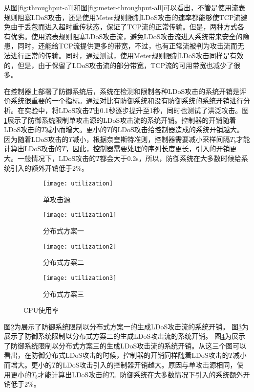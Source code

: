 从图\ref{fig:throughput-all}和图\ref{fig:meter-throughput-all}可以看出，不管是使用流表规则阻塞LDoS攻击，还是使用Meter规则限制LDoS攻击的速率都能够使TCP流避免由于丢包而进入超时重传状态，保证了TCP流的正常传输。但是，两种方式各有优劣。使用流表规则阻塞LDoS攻击流，避免LDoS攻击流进入系统带来安全的隐患，同时，还能给TCP流提供更多的带宽，不过，也有正常流被判为攻击流而无法进行正常的传输。同时，通过测试，使用Meter规则限制LDoS攻击同样是有效的，但是，由于保留了LDoS攻击流的部分带宽，TCP流的可用带宽也减少了很多。

在控制器上部署了防御系统后，系统在检测和限制各种LDoS攻击的系统开销是评价系统很重要的一个指标。通过对比有防御系统和没有防御系统的系统开销进行分析。在实验中，将LDoS攻击$T$由0.1秒逐步提升至1秒，同时也测试了洪泛攻击。图\ref{fig:CPU-single}展示了防御系统限制单攻击源的LDoS攻击流的系统开销。控制器的开销随着LDoS攻击的$T$减小而增大。更小的$T$的LDoS攻击给控制器造成的系统开销越大。因为随着LDoS攻击的$T$减小，根据奈奎斯特准则，控制器需要减小采样间隔$T_b$才能计算出LDoS攻击的$T$，因此，控制器需要处理的序列长度更长，引入的开销更大。一般情况下，LDoS攻击的$T$都会大于0.2s，所以，防御系统在大多数时候给系统引入的额外开销低于2\%。

\begin{figure}
    \begin{subfigure}{.49\textwidth}
        \centering
        \texttt{[image: utilization]}
        \caption{单攻击源}
        \label{fig:CPU-single}
    \end{subfigure}
    \begin{subfigure}{.49\textwidth}
        \centering
        \texttt{[image: utilization1]}
        \caption{分布式方案一}
        \label{fig:CPU-2h-mod1}
    \end{subfigure}

    \begin{subfigure}{.49\textwidth}
        \centering
        \texttt{[image: utilization2]}
        \caption{分布式方案二}
        \label{fig:CPU-2h-mod2}
    \end{subfigure}
    \begin{subfigure}{.49\textwidth}
        \centering
        \texttt{[image: utilization3]}
        \caption{分布式方案三}
        \label{fig:CPU-2h-mod3}
    \end{subfigure}


    \caption{CPU使用率}
    \label{fig:CPU-all}
\end{figure}

图\ref{fig:CPU-2h-mod1}为展示了防御系统限制以分布式方案一的生成LDoS攻击流的系统开销。
图\ref{fig:CPU-2h-mod2}为展示了防御系统限制以分布式方案二的生成LDoS攻击流的系统开销。
图\ref{fig:CPU-2h-mod3}为展示了防御系统限制以分布式方案三的生成LDoS攻击流的系统开销。从这三个图可以看出，在防御分布式LDoS攻击的时候，控制器的开销同样随着LDoS攻击的$T$减小而增大。更小的$T$的LDoS攻击引入的控制器开销越大。原因与单攻击源相同，使用更小的$T_b$才能计算出LDoS攻击的$T$。防御系统在大多数情况下引入的系统额外开销低于2\%。


